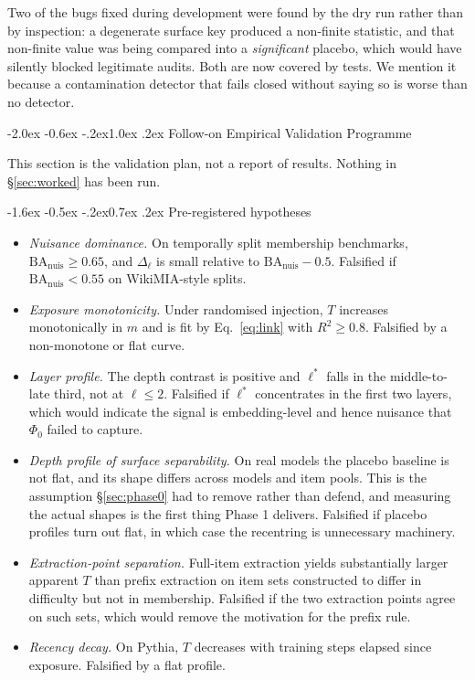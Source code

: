 \documentclass[10pt,twocolumn,letterpaper]{article}
\makeatletter
\renewcommand\section{\@startsection{section}{1}{\z@}%
  {-2.0ex \@plus -0.6ex \@minus -.2ex}{1.0ex \@plus .2ex}%
  {\normalfont\large\bfseries}}
\renewcommand\subsection{\@startsection{subsection}{2}{\z@}%
  {-1.6ex \@plus -0.5ex \@minus -.2ex}{0.7ex \@plus .2ex}%
  {\normalfont\normalsize\bfseries}}
\newcommand{\BA}{\mathrm{BA}}
\newcommand{\nuis}{\mathrm{nuis}}
\makeatother
\begin{document}
Two of the bugs fixed during development were found by the dry run rather than
by inspection: a degenerate surface key produced a non-finite statistic, and
that non-finite value was being compared into a \emph{significant} placebo,
which would have silently blocked legitimate audits. Both are now covered by
tests. We mention it because a contamination detector that fails closed
without saying so is worse than no detector.

\section{Follow-on Empirical Validation Programme}
\label{sec:programme}

This section is the validation plan, not a report of results. Nothing in \S\ref{sec:worked} has been run.

\subsection{Pre-registered hypotheses}

\begin{itemize}\itemsep2pt
\item[\textbf{H1}] \emph{Nuisance dominance.} On temporally split membership benchmarks, $\BA_{\nuis}\ge 0.65$, and $\Delta_{\ell}$ is small relative to $\BA_{\nuis}-0.5$. Falsified if $\BA_{\nuis}<0.55$ on WikiMIA-style splits.
\item[\textbf{H2}] \emph{Exposure monotonicity.} Under randomised injection, $T$ increases monotonically in $m$ and is fit by Eq.~\eqref{eq:link} with $R^2\ge0.8$. Falsified by a non-monotone or flat curve.
\item[\textbf{H3}] \emph{Layer profile.} The depth contrast is positive and $\ell^{*}$ falls in the middle-to-late third, not at $\ell\le 2$. Falsified if $\ell^{*}$ concentrates in the first two layers, which would indicate the signal is embedding-level and hence nuisance that $\Phi_0$ failed to capture.
\item[\textbf{H0}] \emph{Depth profile of surface separability.} On real models the placebo baseline is not flat, and its shape differs across models and item pools. This is the assumption \S\ref{sec:phase0} had to remove rather than defend, and measuring the actual shapes is the first thing Phase 1 delivers. Falsified if placebo profiles turn out flat, in which case the recentring is unnecessary machinery.
\item[\textbf{H4}] \emph{Extraction-point separation.} Full-item extraction yields substantially larger apparent $T$ than prefix extraction on item sets constructed to differ in difficulty but not in membership. Falsified if the two extraction points agree on such sets, which would remove the motivation for the prefix rule.
\item[\textbf{H5}] \emph{Recency decay.} On Pythia, $T$ decreases with training steps elapsed since exposure. Falsified by a flat profile.
\end{itemize}
\end{document}
